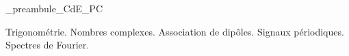 



\ifdefined\mainIsLoaded\else
\RequirePackage{import}
{_preambule_CdE_PC}

\fi






\debutFicheEntrainement                                                                      %




\begin{prerequis}
	Trigonométrie. Nombres complexes. Association de dipôles. 
	Signaux périodiques. Spectres de Fourier.
\end{prerequis}







